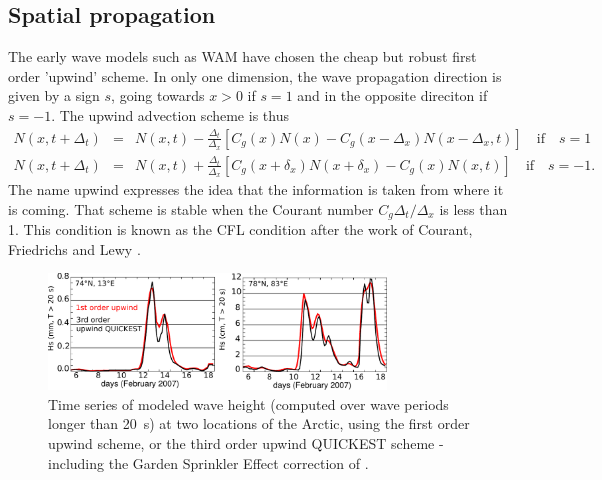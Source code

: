 \subsection{Spatial propagation}
The early wave models such as WAM \citep{WAMDI1988} have chosen the cheap but robust first order 'upwind' scheme. 
In only one dimension, the wave propagation direction is given by a sign $s$, going towards $x>0$ if $s=1$ and in the opposite direciton if $s=-1$. The 
upwind advection scheme is thus 
\begin{eqnarray}
 N(x,t+\Delta_t) & =&  N(x,t) - \frac{\Delta_t}{\Delta_x} \left[ C_g(x) N(x) - C_g(x-\Delta_x) N(x-\Delta_x,t) \right] \quad \mathrm{if} \quad s =1 \\
N(x,t+\Delta_t) & =&  N(x,t) + \frac{\Delta_t}{\Delta_x} \left[ C_g(x+\delta_x) N(x+\delta_x) - C_g(x) N(x,t) \right] \quad \mathrm{if} \quad s=-1. 
\end{eqnarray}
The name upwind expresses the idea that the information is taken from  where it is coming. That scheme is stable when the Courant number 
$C_g \Delta_t/\Delta_x$ is less than 1. This condition is known as the CFL condition after the work of Courant, Friedrichs and Lewy \citep{Courant&al.1928}.
\begin{figure}[htb]
\centerline{\includegraphics[width=0.8\textwidth]{FIGS_CH_MODEL/PR1_UQ_timeseries.pdf}}
\caption{Time series of modeled wave height (computed over wave periods longer than 20~s) at two locations of the Arctic, using 
the first order upwind scheme, or 
the third order upwind QUICKEST scheme - including the Garden Sprinkler Effect correction of  \cite{Tolman2002a}.}
\label{fig:PR1_UQ_time}
\end{figure}

